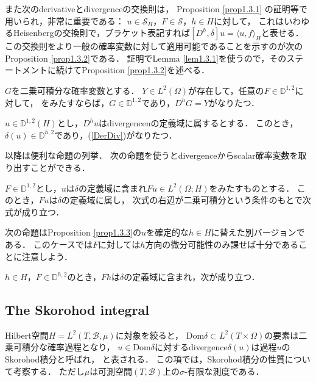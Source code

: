 \begin{definition}
また次のderivativeとdivergenceの交換則は，
Proposition \ref{prop1.3.1} の証明等で用いられ，非常に重要である：
$u\in\mathcal{S}_H$，$F\in\mathcal{S}$，$h\in H$に対して，
これはいわゆるHeisenbergの交換則で，ブラケット表記すれば$\left[D^h,\delta\right]u=\langle u,f\rangle_H$と表せる．
この交換則をより一般の確率変数に対して適用可能であることを示すのが次のProposition \ref{prop1.3.2}である．
証明でLemma \ref{lem1.3.1}を使うので，そのステートメントに続けてProposition \ref{prop1.3.2}を述べる．
\begin{lemma}\label{lem1.3.1}
$G$を二乗可積分な確率変数とする．
$Y\in L^2(\Omega)$が存在して，任意の$F\in\mathbb{D}^{1,2}$に対して，
をみたすならば，$G\in\mathbb{D}^{1,2}$であり，$D^hG=Y$がなりたつ．
\end{lemma}
\begin{proposition}\label{prop1.3.2}
$u\in\mathbb{D}^{1,2}(H)$とし，$D^hu$はdivergencenの定義域に属するとする．
このとき，$\delta(u)\in\mathbb{D}^{h,2}$であり，(\ref{DerDiv})がなりたつ．
\end{proposition}

以降は便利な命題の列挙．
次の命題を使うとdivergenceからscalar確率変数を取り出すことができる．
\begin{proposition}\label{prop1.3.3}
$F\in\mathbb{D}^{1,2}$とし，$u$は$\delta$の定義域に含まれ$Fu\in L^2(\Omega;H)$をみたすものとする．
このとき，$Fu$は$\delta$の定義域に属し，
次式の右辺が二乗可積分という条件のもとで次式が成り立つ．
\end{proposition}
次の命題はProposition \ref{prop1.3.3}の$u$を確定的な$h\in H$に替えた別バージョンである．
このケースでは$F$に対しては$h$方向の微分可能性のみ課せば十分であることに注意しよう．
\begin{proposition}\label{prop1.3.4}
$h\in H$，$F\in\mathbb{D}^{h,2}$のとき，$Fh$は$\delta$の定義域に含まれ，次が成り立つ．
\end{proposition}


\subsection{The Skorohod integral}
Hilbert空間$H=L^2(T,\mathcal{B},\mu)$に対象を絞ると，
$\text{Dom}\delta\subset L^2(T\times\Omega)$の要素は二乗可積分な確率過程となり，
$u\in\text{Dom}\delta$に対するdivergence$\delta(u)$は過程$u$のSkorohod積分と呼ばれ，
と表される．
この項では，Skorohod積分の性質について考察する．
ただし$\mu$は可測空間$(T,\mathcal{B})$上の$\sigma$-有限な測度である．


\end{definition}
